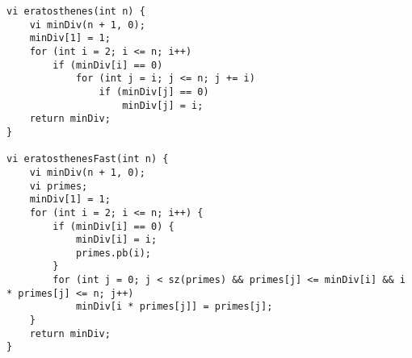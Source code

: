 \begin{verbatim}
vi eratosthenes(int n) {
	vi minDiv(n + 1, 0);
	minDiv[1] = 1;
	for (int i = 2; i <= n; i++)
		if (minDiv[i] == 0) 
			for (int j = i; j <= n; j += i)
				if (minDiv[j] == 0)
					minDiv[j] = i; 
	return minDiv;
}

vi eratosthenesFast(int n) {
	vi minDiv(n + 1, 0);
	vi primes;
	minDiv[1] = 1;
	for (int i = 2; i <= n; i++) {
		if (minDiv[i] == 0) {
			minDiv[i] = i;
			primes.pb(i);
		}
		for (int j = 0; j < sz(primes) && primes[j] <= minDiv[i] && i * primes[j] <= n; j++)
			minDiv[i * primes[j]] = primes[j];
	}	
	return minDiv;
}
\end{verbatim}
